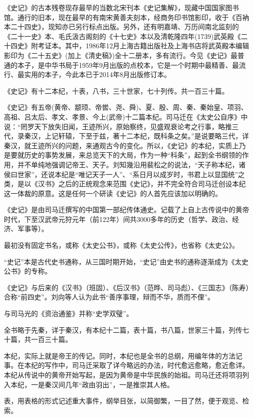 \documentclass[12pt,UTF8]{ctexbook}
\begin{document}
《史记》的古本残卷现存最早的当数北宋刊本《史记集解》，现藏中国国家图书馆。通行的旧本，现在最早的有南宋黄善夫刻本，经商务印书馆影印，收于《百衲本二十四史》，现知亦已另行标点出版。另外，还有明嘉靖、万历间南北监刻的《二十一史》本、毛氏汲古阁刻的《十七史》本以及清乾隆四年(1739)武英殿《二十四史》附考证本。其中，1986年12月上海古籍出版社及上海书店将武英殿本编辑影印为《二十五史》(加上《清史稿》)全十二册本，多有流行。今见《史记》最普通的本子，是中华书局于1959年9月出版的点校本，它是一个时期中最精善、最流行、最实用的本子，今此本已于2014年8月出版修订本。

《史记》有十二本纪，十表，八书，三十世家，七十列传。共一百三十篇。

《史记》有五帝(黄帝、颛顼、帝喾、尧、舜)、夏、殷、周、秦、秦始皇、项羽、高祖、吕太后、孝文、孝景、今上(武帝)十二篇本纪。司马迁在《太史公自序》中说：“罔罗天下放失旧闻，王迹所兴，原始察终，见盛观衰论考之行事，略推三代，录秦汉，上记轩辕，下至于兹，著十二本纪，既科条之矣。”是说要略三代，详秦汉，就王迹所兴的问题，来通观古今的变化。所以，《史记》的本纪，实质上乃是要就历史的事势发展，来总览天下的大局，作为一种“科条”，起到全书纲领的作用，并不单纯地强调记帝王、天子。刘知幾沿用裴松之的说法，“天子称本纪，诸侯曰世家”，还说本纪是“唯记天子一人”、“系日月以成岁时，书君上以显国统”之类，是以《汉书》之后的正统观念来范围《史记》，并不完全符合司马迁创设本纪这一体裁的原意。这是任何一个研读《史记》的人首先应该加以明确的。

《史记》是由司马迁撰写的中国第一部纪传体通史。记载了上自上古传说中的黄帝时代，下至汉武帝元狩元年（前122年）间共3000多年的历史（哲学、政治、经济、军事等）。

最初没有固定书名，或称《太史公书》，或称《太史公传》，也省称《太史公》。

“史记”本是古代史书通称，从三国时期开始，“史记”由史书的通称逐渐成为《太史公书》的专称。

《史记》与后来的《汉书》（班固）、《后汉书》（范晔、司马彪）、《三国志》（陈寿）合称“前四史”。刘向等人认为此书“善序事理，辩而不华，质而不俚”。

与司马光的《资治通鉴》并称“史学双璧”。

全书略于先秦，详于秦汉，有本纪十二篇，表十篇，书八篇，世家三十篇，列传七十篇，共一百三十篇。

本纪，实际上就是帝王的传记。同时，本纪也是全书的总纲，用编年体的方法记事。在本纪的写作中，司马迁采取了详今略远的办法，时代愈远愈略，愈近愈详。本纪从传说中的黄帝开始写起，是因为黄帝是中华民族的始祖。司马迁还将项羽列入本纪，一是秦汉间几年“政由羽出”，一是推崇其人格。

表，用表格的形式记述重大事件，纲举目张，以简御繁，一目了然，便于观览、检索。
\end{document}
